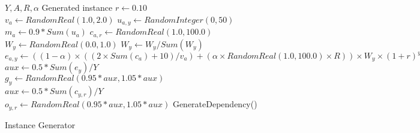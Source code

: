 \begin{figure}
\begin{algorithmic}[1]
\REQUIRE $Y, A, R, \alpha$
\ENSURE Generated instance
\STATE $r \gets 0.10$
  \label{alg:gen:line:actionbegin}
  \STATE $v_a \gets RandomReal(1.0, 2.0)$
    \label{alg:gen:line:actionvalue}
    \STATE $u_{a,y} \gets RandomInteger(0, 50)$
      \label{alg:gen:line:market}
  \ENDFOR
  \STATE $m_{a} \gets 0.9 * Sum(u_{a})$
    \label{alg:gen:line:uc}
    \STATE $c_{a,r} \gets RandomReal(1.0, 100.0)$
      \label{alg:gen:line:cost}
  \ENDFOR
    \label{alg:gen:line:vectorbegin}
    \STATE $W_{y} \gets RandomReal(0.0, 1.0)$
  \ENDFOR
    \STATE $W_{y} \gets W_{y}/Sum(W_y)$
  \ENDFOR
    \label{alg:gen:line:vectorend}
    \STATE $e_{a,y} \gets ((1 - \alpha) \times ((2 \times Sum(c_{a}) + 10)/v_a) + (\alpha \times RandomReal(1.0, 100.0) \times R)) \times W_{y} \times (1 + r)^y$
      \label{alg:gen:line:rec}
  \ENDFOR
\ENDFOR
  \label{alg:gen:line:actionend}
  \label{alg:gen:line:budgbegin}
  \STATE $aux \gets 0.5 * Sum(e_{y})/Y$
  \STATE $g_{y} \gets RandomReal(0.95*aux, 1.05*aux)$
    \STATE $aux \gets 0.5 * Sum(c_{y,r})/Y$
    \STATE $o_{y,r} \gets RandomReal(0.95*aux, 1.05*aux)$
  \ENDFOR
\ENDFOR
  \label{alg:gen:line:budgend}
  \STATE GenerateDependency()
    \label{alg:gen:line:deps}
\ENDFOR
\end{algorithmic}
\caption{Instance Generator}
\label{alg:gen}
\end{figure}
